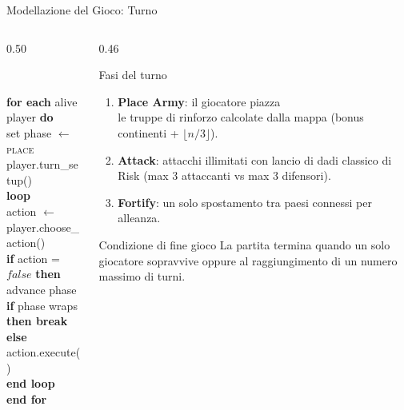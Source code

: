 \documentclass[9pt,serif,usenames,dvipsnames]{beamer}
\newenvironment{pseudocode}{%
	\begin{tabbing}%
		\hspace{1.4em}\=\hspace{1.4em}\=\hspace{1.4em}\=\kill%
	}{%
	\end{tabbing}%
}
\newcommand{\pckw}[1]{\textbf{#1}}
\begin{document}
	\begin{frame}{\centering Modellazione del Gioco: Turno}
		\begin{columns}[T]
			\begin{column}{0.50\textwidth}
				\begin{tcolorbox}[
					enhanced,
					colback=gray!4,
					colframe=customgreen!70,
					boxrule=0.5pt,
					fonttitle=\bfseries\small,
					title={Struttura di un turno}]
					\footnotesize
					\begin{pseudocode}
						\pckw{for each} alive player \pckw{do} \\
						\> set phase $\leftarrow$ \textsc{place} \\
						\> player.turn\_setup() \\[2pt]
						\> \pckw{loop} \\
						\>\> action $\leftarrow$ player.choose\_action() \\
						\>\> \pckw{if} action = $false$ \pckw{then} \\
						\>\>\> advance phase \\
						\>\>\> \pckw{if} phase wraps \pckw{then break} \\
						\>\> \pckw{else} \\
						\>\>\> action.execute() \\
						\> \pckw{end loop} \\
						\pckw{end for}
					\end{pseudocode}
				\end{tcolorbox}
			\end{column}

			\begin{column}{0.46\textwidth}
				\vspace{0.1cm}
				\begin{block}{Fasi del turno}
					\small
					\begin{enumerate}
						\item \textbf{Place Army}: il giocatore piazza \\le truppe di rinforzo
						calcolate dalla mappa (bonus continenti + $\lfloor n/3 \rfloor$).
						\item \textbf{Attack}: attacchi illimitati con lancio di dadi classico
						di Risk (max 3 attaccanti vs max 3 difensori).
						\item \textbf{Fortify}: un solo spostamento tra paesi connessi
						per alleanza.
					\end{enumerate}
				\end{block}
				\vspace{0.2cm}
				\begin{block}{Condizione di fine gioco}
					\small
					La partita termina quando \alert{un solo giocatore} sopravvive oppure
					al raggiungimento di un \alert{numero massimo di turni}.
				\end{block}
			\end{column}
		\end{columns}
	\end{frame}
\end{document}
